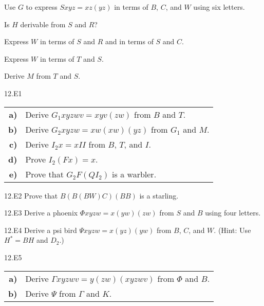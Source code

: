 \documentclass[12pt, letterpaper]{article}
\begin{document}
\begin{prob}{12.12}  
Use $G$ to express $Sxyz = xz(yz)$ in terms of $B$, $C$, and $W$ using six letters.
\end{prob}

\begin{prob}{12.13}  
Is $H$ derivable from $S$ and $R$?
\end{prob}

\begin{prob}{12.14} 
Express $W$ in terms of $S$ and $R$ and in terms of $S$ and $C$.
\end{prob}

\begin{prob}{12.15}  
Express $W$ in terms of $T$ and $S$.
\end{prob}

\begin{prob}{12.16}  
Derive $M$ from $T$ and $S$.
\end{prob}

\begin{prob}{12.E1} 
\end{prob}

\begin{tabular}{r l}
\textbf{a)} & Derive $G_1xyzwv = xyv(zw)$ from $B$ and $T$. \\
\textbf{b)} & Derive $G_2xyzw = xw(xw)(yz)$ from $G_1$ and $M$. \\
\textbf{c)} & Derive $I_2x = xII$ from $B$, $T$, and $I$. \\
\textbf{d)} & Prove $I_2(Fx) = x$. \\
\textbf{e)} & Prove that $G_2F(QI_2)$ is a warbler.
\end{tabular}

\begin{prob}{12.E2}  
Prove that $B(B(BW)C)(BB)$ is a starling.
\end{prob}

\begin{prob}{12.E3}  
Derive a phoenix $\Phi xyzw = x(yw)(zw)$ from $S$ and $B$ using four letters.
\end{prob}

\begin{prob}{12.E4}  
Derive a psi bird $\Psi xyzw = x(yz)(yw)$ from $B$, $C$, and $W$. (Hint: Use $H^* = BH$ and $D_2$.)
\end{prob}

\begin{prob}{12.E5} 
\end{prob}
\begin{tabular}{r l}
\textbf{a)} & Derive $\Gamma xyzwv = y(zw)(xyzwv)$ from $\Phi$ and $B$. \\
\textbf{b)} & Derive $\Psi$ from $\Gamma$ and $K$.
\end{tabular}
\end{document}
